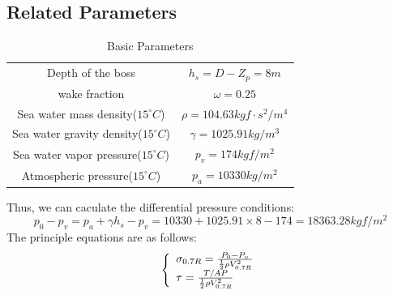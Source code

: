 \documentclass[a4paper,UTF8]{article}
\begin{document}
\subsection{Related Parameters}
\begin{table}[!htbp]
	\centering
	\begin{tabular}{cc}
	\hline
	Depth of the boss & $h_s=D-Z_p=8m$\\
	wake fraction &$\omega=0.25$\\
	\hline
	Sea water mass density($15^{\circ}C$)&$\rho=104.63kgf\cdot s^2/m^4$\\
	Sea water gravity density($15^{\circ}C$)&$\gamma=1025.91kg/m^3$\\
	Sea water vapor pressure($15^{\circ}C$)&$p_v=174kgf/m^2$\\
	Atmospheric pressure($15^{\circ}C$)&$p_a=10330kg/m^2$\\
	\hline
	\end{tabular}
	\caption{Basic Parameters}
\end{table}
Thus, we can caculate the differential pressure conditions:
\begin{equation}
	p_0-p_v=p_a+\gamma h_s-p_v=10330+1025.91×8−174 = 18363.28kgf/m^2
\end{equation}
The principle equations are as follows:\\
\begin{equation}
\centering
\left\{
\begin{array}{lr}
\sigma_{0.7R}=\frac{P_0-P_v}{\frac{1}{2}\rho V_{0.7R}^2} \\
\tau=\frac{T/AP}{\frac{1}{2}\rho V_{0.7R}^2} 
\end{array}
\right.
\label{equ:kongpao}
\end{equation}
\end{document}
